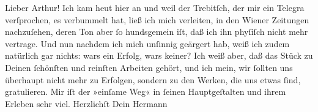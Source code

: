 \pstart{}Lieber Arthur!\pend\vspace{0.5em}
\pstart
           Ich kam heut hier an und weil der Trebitſch,
               der mir ein Telegra{\geminationm} verſprochen, es verbummelt hat,
               ließ ich mich verleiten, in den Wiener Zeitungen
               nachzuſehen, deren Ton aber ſo hundsgemein iſt, daß ich ihn phyſiſch nicht mehr
               vertrage. Und nun nachdem ich mich unſinnig geärgert hab, weiß ich zudem natürlich
               gar nichts: wars ein Erfolg, wars keiner? Ich weiß aber, daß das Stück zu Deinen ſchönſten und reinſten
               Arbeiten gehört, und ich mein, wir ſollten uns überhaupt nicht mehr zu Erfolgen,
               sondern zu den Werken, die uns etwas ſind, gratulieren. Mir iſt der »einſame Weg« in ſeinen Hauptgeſtalten und ihrem
               Erleben sehr viel.\pend
           \pstart Herzlichſt \hspace*{1.5em}Dein \spacefill\mbox{Hermann}\pend{}\endnumbering{}  
      